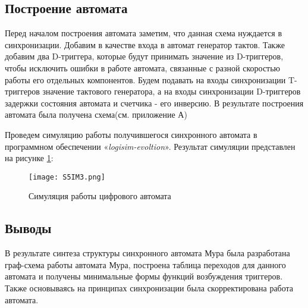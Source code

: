 \subsection{Построение автомата}
Перед началом построения автомата заметим, что данная схема нуждается в синхронизации. Добавим в качестве входа в автомат генератор тактов. Также добавим два D-триггера, которые будут принимать значение из D-триггеров, чтобы исключить ошибки в работе автомата, связанные с разной скоростью работы его отдельных компонентов. Будем подавать на входы синхронизации T-триггеров значение тактового генератора, а на входы синхронизации D-триггеров задержки состояния автомата и счетчика - его инверсию. В результате построения автомата была получена схема(см. приложение А)


Проведем симуляцию работы получившегося синхронного автомата в программном обеспечении «\textit{logisim-evoltion}». Результат симуляции представлен на рисунке \ref{fig:section5:simulation}:

\begin{figure}[H]
    \centering
    \texttt{[image: S5IM3.png]}
    \caption{Симуляция работы цифрового автомата}
    \label{fig:section5:simulation}
\end{figure}

\subsection{Выводы}
В результате синтеза структуры синхронного автомата Мура была
разработана граф-схема работы автомата Мура, построена таблица переходов
для данного автомата и получены минимальные формы функций возбуждения
триггеров. Также основываясь на принципах синхронизации была скорректирована работа автомата.